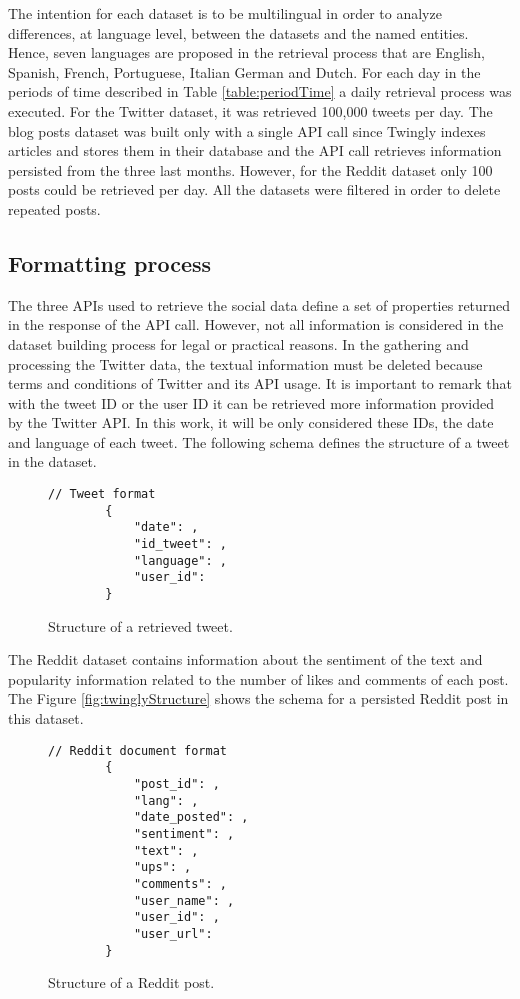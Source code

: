 \par 
The intention for each dataset is to be multilingual in order to analyze differences, at language level, between the datasets and the named entities. Hence, seven languages are proposed in the retrieval process that are English, Spanish, French, Portuguese, Italian German and Dutch.
For each day in the periods of time described in Table \ref{table:periodTime} a daily retrieval process was executed. For the Twitter dataset, it was retrieved 100,000 tweets per day. The blog posts dataset was built only with a single API call since Twingly indexes articles and stores them in their database and the API call retrieves information persisted from the three last months. However, for the Reddit dataset only 100 posts could be retrieved per day. All the datasets were filtered in order to delete repeated posts. 
\subsection{Formatting process}
The three APIs used to retrieve the social data define a set of properties returned in the response of the API call. However, not all information is considered in the dataset building process for legal or practical reasons. In the gathering and processing the Twitter data, the textual information must be deleted because terms and conditions of Twitter and its API usage. It is important to remark that with the tweet ID or the user ID it can be retrieved more information provided by the Twitter API. In this work, it will be only considered these IDs, the date and language of each tweet. The following schema defines the structure of a tweet in the dataset.
\begin{figure}[H]
	\begin{Verbatim}[xleftmargin=.5in]
		// Tweet format
		{
			"date": ,
			"id_tweet": ,
			"language": ,
			"user_id": 
		}
	\end{Verbatim}
	\caption{Structure of a retrieved tweet.}
\end{figure}


\par 

The Reddit dataset contains information about the sentiment of the text and popularity information related to the number of likes and comments of each post. The Figure \ref{fig:twinglyStructure} shows the schema for a persisted Reddit post in this dataset.
\begin{figure}[H]
	\begin{Verbatim}[xleftmargin=.5in]
		// Reddit document format
		{
			"post_id": ,
			"lang": ,
			"date_posted": ,
			"sentiment": ,
			"text": ,
			"ups": ,
			"comments": ,
			"user_name": ,
			"user_id": ,
			"user_url": 
		}
	\end{Verbatim}
	\caption{Structure of a Reddit post.}
	\label{fig:redditStructure}
\end{figure}

